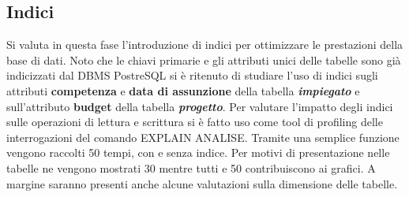 \documentclass{article}
\begin{document}
\subsection{Indici}
Si valuta in questa fase l'introduzione di indici per ottimizzare le prestazioni della base di dati.
\newline
\newline
Noto che le chiavi primarie e gli attributi unici delle tabelle sono già indicizzati dal DBMS PostreSQL si è ritenuto di studiare l'uso di indici sugli attributi \textbf{competenza} e \textbf{data di assunzione} della tabella \textit{\textbf{impiegato}} e sull'attributo \textbf{budget} della tabella \textit{\textbf{progetto}}.
\newline
\newline
Per valutare l'impatto degli indici sulle operazioni di lettura e scrittura si è fatto uso come tool di profiling delle interrogazioni del comando EXPLAIN ANALISE.
\newline
\newline
Tramite una semplice funzione vengono raccolti 50 tempi, con e senza indice.
\newline
Per motivi di presentazione nelle tabelle ne vengono mostrati 30 mentre tutti e 50 contribuiscono ai grafici.
\newline
A margine saranno presenti anche alcune valutazioni sulla dimensione delle tabelle.
\end{document}
